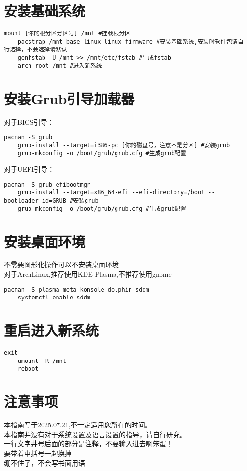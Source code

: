 \documentclass[a4paper,12pt]{article}
\begin{document}
\section{安装基础系统}
\begin{lstlisting}[language=Shell]
	mount [你的根分区分区号] /mnt #挂载根分区
	pacstrap /mnt base linux linux-firmware #安装基础系统,安装时软件包请自行选择，不会选择请默认
	genfstab -U /mnt >> /mnt/etc/fstab #生成fstab
	arch-root /mnt #进入新系统
\end{lstlisting}

\section{安装Grub引导加载器}
对于BIOS引导：
\begin{lstlisting}[language=Shell]
	pacman -S grub
	grub-install --target=i386-pc [你的磁盘号，注意不是分区] #安装grub
	grub-mkconfig -o /boot/grub/grub.cfg #生成grub配置
\end{lstlisting}
对于UEFI引导：
\begin{lstlisting}[language=Shell]
	pacman -S grub efibootmgr
	grub-install --target=x86_64-efi --efi-directory=/boot --bootloader-id=GRUB #安装grub
	grub-mkconfig -o /boot/grub/grub.cfg #生成grub配置
\end{lstlisting}

\section{安装桌面环境}
不需要图形化操作可以不安装桌面环境\\
对于ArchLinux,推荐使用KDE Plasma,不推荐使用gnome\\
\begin{lstlisting}[language=Shell]
	pacman -S plasma-meta konsole dolphin sddm
	systemctl enable sddm
\end{lstlisting}

\section{重启进入新系统}
\begin{lstlisting}[language=Shell]
	exit
	umount -R /mnt
	reboot
\end{lstlisting}

\section{注意事项}
本指南写于2025.07.21,不一定适用您所在的时间。\\
本指南并没有对于系统设置及语言设置的指导，请自行研究。\\
一行文字井号后面的部分是注释，不要输入进去啊笨蛋！\\
[括起来的]要带着中括号一起换掉\\
绷不住了，不会写书面用语\\
\end{document}
